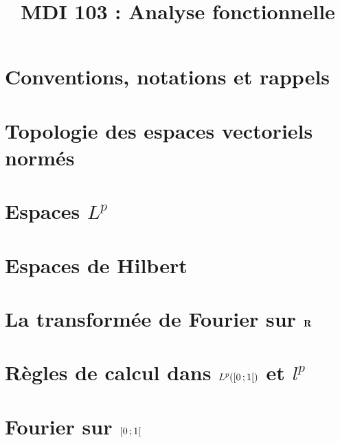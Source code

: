 \documentclass[a4paper,9pt]{article}
\title{\vspace{-1.2cm} \textbf{MDI 103 : Analyse fonctionnelle}}
\begin{document}
\maketitle

\vspace{-1.5cm}

\section{Conventions, notations et rappels}

	

\section{Topologie des espaces vectoriels normés}

	

\section{Espaces $L^p$}

	

\section{Espaces de Hilbert}

	

\section{La transformée de Fourier sur $\mathbf{R}$}

	

\section{Règles de calcul dans $L^p(\mathopen{}\mathclose{\left[0\mathclose{}\mathpunct{};1\right[})$ et $l^p$}

	

\section{Fourier sur $\mathopen{}\mathclose{\left[0\mathclose{}\mathpunct{};1\right[}$}

	
\end{document}
